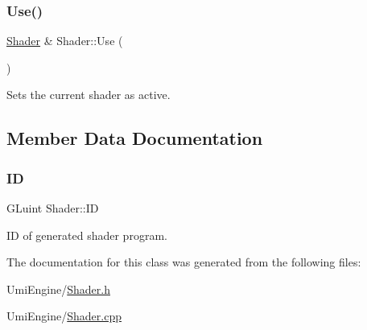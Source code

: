 \subsubsection{\texorpdfstring{Use()}{Use()}}
{\footnotesize\ttfamily \mbox{\hyperlink{class_shader}{Shader}} \& Shader\+::\+Use (\begin{DoxyParamCaption}{ }\end{DoxyParamCaption})}



Sets the current shader as active. 



\subsection{Member Data Documentation}
\mbox{\label{class_shader_a7be2afcbd5ba5873a04536a2b4b5e576}} 
\subsubsection{\texorpdfstring{ID}{ID}}
{\footnotesize\ttfamily G\+Luint Shader\+::\+ID}



ID of generated shader program. 



The documentation for this class was generated from the following files\+:\begin{DoxyCompactItemize}
\item 
Umi\+Engine/\mbox{\hyperlink{_shader_8h}{Shader.\+h}}\item 
Umi\+Engine/\mbox{\hyperlink{_shader_8cpp}{Shader.\+cpp}}\end{DoxyCompactItemize}
